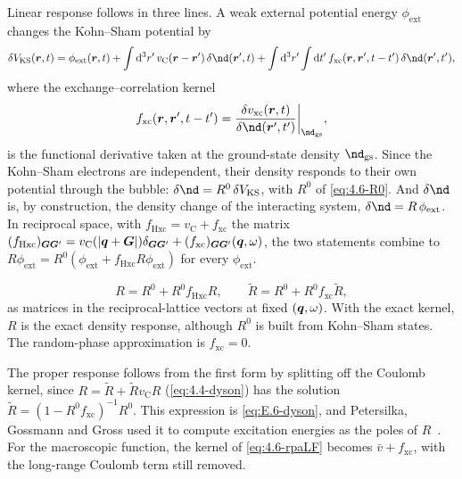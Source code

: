 Linear response follows in three lines. A weak external potential energy $\phi_{\mathrm{ext}}$ changes the Kohn--Sham potential by
\begin{equation*}
  \delta V_{\mathrm{KS}}(\vect{r},t) = \phi_{\mathrm{ext}}(\vect{r},t) + \int\dd^3r'\,v_{\mathrm{C}}(\vect{r} - \vect{r}')\,\delta\nd(\vect{r}',t)
  + \int\dd^3r'\int\dd t'\,f_{\mathrm{xc}}(\vect{r},\vect{r}',t - t')\,\delta\nd(\vect{r}',t') ,
\end{equation*}
where the exchange--correlation kernel
\begin{equation}
  f_{\mathrm{xc}}(\vect{r},\vect{r}',t - t') = \frac{\delta v_{\mathrm{xc}}(\vect{r},t)}{\delta\nd(\vect{r}',t')}\bigg|_{\nd_{\mathrm{gs}}} ,
  \label{eq:4.6-fxc}
\end{equation}
is the functional derivative taken at the ground-state density $\nd_{\mathrm{gs}}$. Since the Kohn--Sham electrons are independent, their density responds to their own potential through the bubble: $\delta\nd = R^0\,\delta V_{\mathrm{KS}}$, with $R^0$ of \cref{eq:4.6-R0}. And $\delta\nd$ is, by construction, the density change of the interacting system, $\delta\nd = R\,\phi_{\mathrm{ext}}$. In reciprocal space, with $f_{\mathrm{Hxc}} = v_{\mathrm{C}} + f_{\mathrm{xc}}$ the matrix $(f_{\mathrm{Hxc}})_{\bm{G}\bm{G}'} = v_{\mathrm{C}}(|\bm{q}+\bm{G}|)\delta_{\bm{G}\bm{G}'} + (f_{\mathrm{xc}})_{\bm{G}\bm{G}'}(\bm{q},\omega)$, the two statements combine to $R\phi_{\mathrm{ext}} = R^0(\phi_{\mathrm{ext}} + f_{\mathrm{Hxc}}R\phi_{\mathrm{ext}})$ for every $\phi_{\mathrm{ext}}$.
\begin{keyresult}
\begin{equation}
  R = R^0 + R^0 f_{\mathrm{Hxc}} R, \qquad \tilde R = R^0 + R^0 f_{\mathrm{xc}}\tilde R ,
  \label{eq:4.6-tddft}
\end{equation}
as matrices in the reciprocal-lattice vectors at fixed $(\bm{q},\omega)$. With the exact kernel, $R$ is the exact density response, although $R^0$ is built from Kohn--Sham states. The random-phase approximation is $f_{\mathrm{xc}} = 0$.
\end{keyresult}
The proper response follows from the first form by splitting off the Coulomb kernel, since $R = \tilde R + \tilde Rv_{\mathrm{C}}R$ (\cref{eq:4.4-dyson}) has the solution $\tilde R = (1 - R^0f_{\mathrm{xc}})^{-1}R^0$. This expression is \cref{eq:E.6-dyson}, and Petersilka, Gossmann and Gross used it to compute excitation energies as the poles of $R$~\cite{petersilka1996excitation}. For the macroscopic function, the kernel of \cref{eq:4.6-rpaLF} becomes $\bar v + f_{\mathrm{xc}}$, with the long-range Coulomb term still removed.

